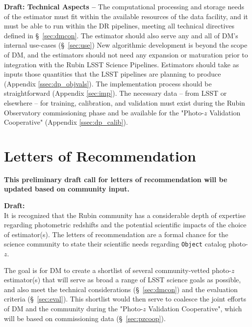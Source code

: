 \documentclass[DM,lsstdraft,toc]{lsstdoc}
\begin{document}
{\bf Draft: Technical Aspects --}
The computational processing and storage needs of the estimator must fit within the available resources of the data facility, and it must be able to run within the DR pipelines, meeting all technical directives defined in \S~\ref{sec:dmcon}. 
The estimator should also serve any and all of DM's internal use-cases (\S~\ref{sec:use})
New algorithmic development is beyond the scope of DM, and the estimators should not need any expansion or maturation prior to integration with the Rubin LSST Science Pipelines.
Estimators should take as inputs those quantities that the LSST pipelines are planning to produce (Appendix \ref{ssec:dp_objvals}).
The implementation process should be straightforward (Appendix \ref{sec:imp}).
The necessary data -- from LSST or elsewhere -- for training, calibration, and validation must exist during the Rubin Observatory commissioning phase and be available for the "Photo-$z$ Validation Cooperative" (Appendix \ref{ssec:dp_calib}).

\section{Letters of Recommendation} \label{sec:lor}

\textbf{This preliminary draft call for letters of recommendation will be updated based on community input.}

\textbf{Draft:} \\
It is recognized that the Rubin community has a considerable depth of expertise regarding photometric redshifts and the potential scientific impacts of the choice of estimator(s).
The letters of recommendation are a formal chance for the science community to state their scientific needs regarding {\tt Object} catalog photo-$z$.

The goal is for DM to create a shortlist of several community-vetted photo-$z$ estimator(s) that will serve as broad a range of LSST science goals as possible, and also meet the technical considerations (\S~\ref{sec:dmcon}) and the evaluation criteria (\S~\ref{sec:eval}).
This shortlist would then serve to coalesce the joint efforts of DM and the community during the  "Photo-$z$ Validation Cooperative", which will be based on commissioning data (\S~\ref{sec:pzcoop}). 
\end{document}
